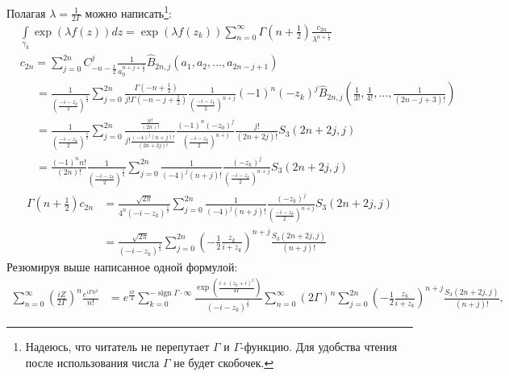 \documentclass[a4paper, 12pt]{article}
\DeclareMathOperator*{\sign}{sign}
\begin{document}
Полагая $\lambda = \frac{1}{2\Gamma}$ можно написать\footnote{Надеюсь, что читатель не перепутает $\Gamma$ и $\Gamma$-функцию. Для удобства чтения после использования числа $\Gamma$ не будет скобочек.}:
\begin{equation}
\begin{aligned}
    &\int\limits_{\gamma_k} \exp\left(\lambda f(z)\right) dz 
    = \exp\left(\lambda f(z_k)\right)\sum\limits_{n=0}^{\infty} \Gamma\left(n+\frac{1}{2}\right)\frac{c_{2n}}{\lambda^{n+\frac{1}{2}}}\\
    &c_{2n} =
    \sum\limits_{j=0}^{2n} C_{-n-\frac{1}{2}}^j\frac{1}{a_0^{n+j+\frac{1}{2}}}\hat{B}_{2n, j}\left(a_1, a_2, \dots, a_{2n-j+1}\right) \\
    &\;\;\;\;\; = \frac{1}{\left(\frac{-i-z_k}{2}\right)^{\frac{1}{2}}}
    \sum\limits_{j=0}^{2n} \frac{\Gamma\left(-n+\frac{1}{2}\right)}{j!\Gamma\left(-n-j+\frac{1}{2}\right)}
    \frac{1}{\left(\frac{-i-z_k}{2}\right)^{n+j}}
    (-1)^n (-z_k)^j\hat B_{2n, j}\left(\frac{1}{3!}, \frac{1}{4!}, \dots, \frac{1}{(2n-j+3)!}\right)\\
    &\;\;\;\;\; = \frac{1}{\left(\frac{-i-z_k}{2}\right)^{\frac{1}{2}}}
    \sum\limits_{j=0}^{2n} \frac{\frac{n!}{(2n)!}}{j!\frac{(-4)^j(n+j)!}{(2n+2j)!}}
    \frac{(-1)^n (-z_0)^j}{\left(\frac{-i-z_k}{2}\right)^{n+j}} \frac{j!}{(2n+2j)!}S_3(2n+2j, j)\\
    &\;\;\;\;\; = \frac{(-1)^n n!}{(2n)!}\frac{1}{\left(\frac{-i-z_k}{2}\right)^{\frac{1}{2}}}
    \sum\limits_{j=0}^{2n} \frac{1}{(-4)^j(n+j)!}
    \frac{ (-z_k)^j}{\left(\frac{-i-z_k}{2}\right)^{n+j}} S_3(2n+2j, j)
\end{aligned}
\end{equation}
\begin{equation}
\begin{aligned}
    \Gamma\left(n+\frac{1}{2}\right)c_{2n} &= \frac{\sqrt{2\pi}}{4^n \left(-i-z_k\right)^{\frac{1}{2}}}
    \sum\limits_{j=0}^{2n} \frac{1}{(-4)^j(n+j)!}
    \frac{ (-z_k)^j}{\left(\frac{-i-z_k}{2}\right)^{n+j}} S_3(2n+2j, j) \\
    &=\frac{\sqrt{2\pi}}{\left(-i-z_k\right)^{\frac{1}{2}}}
    \sum\limits_{j=0}^{2n}\left(-\frac{1}{2}\frac{z_k}{i+z_k}\right)^{n+j}\frac{S_3(2n+2j, j)}{(n+j)!}
\end{aligned}
\end{equation}
Резюмируя выше написанное одной формулой:
\begin{equation}
\begin{aligned}
    \sum\limits_{n=0}^{\infty}\left(\frac{iZ}{2\Gamma}\right)^n  \frac{e^{i\Gamma n^2}}{n!} &= e^{\frac{i\pi}{4}}
    \sum\limits_{k=0}^{-\sign\Gamma\cdot\infty} \frac{\exp\left(\frac{i+(z_k+i)^2}{4\Gamma}\right)}{(-i-z_k)^{\frac{1}{2}}}
    \sum\limits_{n=0}^{\infty}\left(2\Gamma\right)^n
    \sum\limits_{j=0}^{2n}\left(-\frac{1}{2}\frac{z_k}{i+z_k}\right)^{n+j}\frac{S_3(2n+2j, j)}{(n+j)!},
\end{aligned}
\end{equation}
\end{document}
